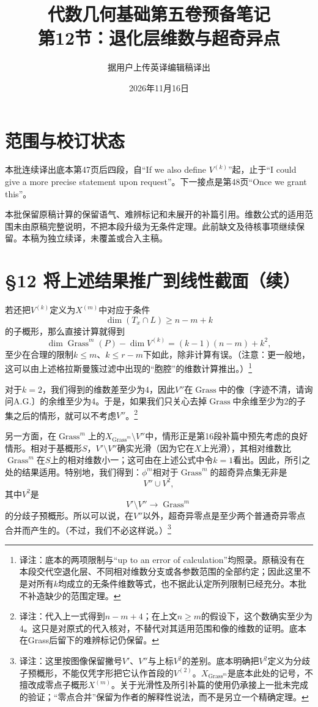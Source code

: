 \documentclass[openany,fontset=fandol]{ctexbook}
\newcommand{\note}[1]{\footnote{译注：#1}}
\begin{document}
\title{代数几何基础第五卷预备笔记\\第12节：退化层维数与超奇异点}
\author{据用户上传英译编辑稿译出}
\date{2026年11月16日}
\maketitle
\chapter*{范围与校订状态}
本批连续译出底本第47页后四段，自“If we also define $V^{(k)}$”起，止于“I could give a more precise statement upon request”。下一接点是第48页“Once we grant this”。

本批保留原稿计算的保留语气、难辨标记和未展开的补篇引用。维数公式的适用范围未由原稿完整说明，不把本段升级为无条件定理。此前缺文及待核事项继续保留。本稿为独立续译，未覆盖或合入主稿。
\chapter*{§12 将上述结果推广到线性截面（续）}
若还把$V^{(k)}$定义为$X^{(m)}$中对应于条件
\[
\dim(T_x\cap L)\geq n-m+k
\]
的子概形，那么直接计算就得到
\[
\dim\operatorname{Grass}^{m}(P)-\dim V^{(k)}
=(k-1)(n-m)+k^2,
\]
至少在合理的限制$k\leq m$、$k\leq r-m$下如此，除非计算有误。（注意：更一般地，这可以由上述格拉斯曼簇过滤中出现的“胞腔”的维数计算推出。）\note{底本的两项限制与“up to an error of calculation”均照录。原稿没有在本段交代空退化层、不同相对维数分支或各参数范围的全部约定；因此这里不是对所有$k$均成立的无条件维数等式，也不据此认定所列限制已经充分。本批不补造缺少的范围定理。}

对于$k=2$，我们得到的维数差至少为4，因此$V''$在$\operatorname{Grass}$中的像〔字迹不清，请询问A.G.〕的余维至少为4。于是，如果我们只关心去掉$\operatorname{Grass}$中余维至少为2的子集之后的情形，就可以不考虑$V''$。\note{代入上一式得到$n-m+4$；在上文$n\geq m$的假设下，这个数确实至少为4。这只是对原式的代入核对，不替代对其适用范围和像的维数的证明。底本在Grass后留下的难辨标记仍保留。}

\newpage
另一方面，在$\operatorname{Grass}^{m}$上的$X_{\operatorname{Grass}^{m}}\setminus V''$中，情形正是第16段补篇中预先考虑的良好情形。相对于基概形$S$，$V'\setminus V''$确实光滑（因为它在$X$上光滑），其相对维数比$\operatorname{Grass}^{m}$在$S$上的相对维数小一；这可由在上述公式中令$k=1$看出。因此，所引之处的结果适用。特别地，我们得到：$\phi^m$相对于$\operatorname{Grass}^{m}$的超奇异点集无非是
\[
V''\cup V^2,
\]
其中$V^2$是
\[
V'\setminus V''\longrightarrow\operatorname{Grass}^{m}
\]
的分歧子预概形。所以可以说，在$V''$以外，超奇异零点是至少两个普通奇异零点合并而产生的。（不过，我们不必这样说。）\note{这里按图像保留撇号$V'$、$V''$与上标$V^2$的差别。底本明确把$V^2$定义为分歧子预概形，不能仅凭字形把它认作首段的$V^{(2)}$。$X_{\operatorname{Grass}^{m}}$是底本此处的记号，不擅改成零点子概形$X^{(m)}$。关于光滑性及所引补篇的使用仍承接上一批未完成的验证；“零点合并”保留为作者的解释性说法，而不是另立一个精确定理。}
\end{document}
